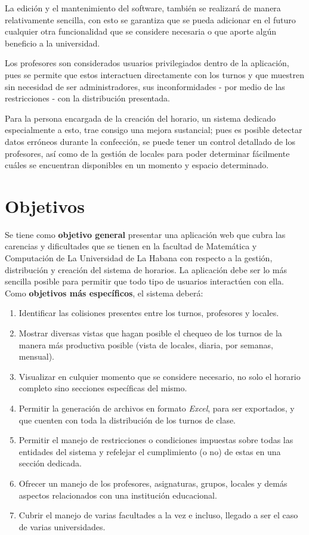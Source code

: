 \begin{introduction}
	La edición y el mantenimiento del software, también se realizará de manera relativamente sencilla, con esto se garantiza que se pueda adicionar en el futuro cualquier otra funcionalidad que se considere necesaria o que aporte algún beneficio a la universidad. 
	
	Los profesores son considerados usuarios privilegiados dentro de la aplicación, pues se permite que estos interactuen directamente con los turnos y que muestren sin necesidad de ser administradores, sus inconformidades - por medio de las restricciones -  con la distribución presentada.
	
	Para la persona encargada de la creación del horario, un sistema dedicado especialmente a esto, trae consigo una mejora sustancial; pues es posible detectar datos erróneos durante la confección, se puede tener un control detallado de los profesores, así como de la gestión de locales para poder determinar fácilmente cuáles se encuentran disponibles en un momento y espacio determinado.

	
	\section{Objetivos}
	Se tiene como \textbf{objetivo general} presentar una aplicación web que cubra las carencias y dificultades que se tienen en la facultad de Matemática y Computación de La Universidad de La Habana con respecto a la gestión, distribución y creación del sistema de horarios. 
	La aplicación debe ser lo más sencilla posible para permitir que todo tipo de usuarios interactúen con ella. Como \textbf{objetivos más específicos}, el sistema deberá:
	\begin{enumerate}
		\item Identificar las colisiones presentes entre los turnos, profesores y locales.
		\item Mostrar diversas vistas que hagan posible el chequeo de los turnos de la manera más productiva posible (vista de locales, diaria, por semanas, mensual).
		\item Visualizar en culquier momento que se considere necesario, no solo el horario completo sino secciones específicas del mismo.
		\item Permitir la generación de archivos en formato \textit{Excel}, para ser exportados, y que cuenten con toda la distribución de los turnos de clase.
		\item Permitir el manejo de restricciones o condiciones impuestas sobre todas las entidades del sistema y refelejar el cumplimiento (o no) de estas en una sección dedicada.
		\item Ofrecer un manejo de los profesores, asignaturas, grupos, locales y demás aspectos relacionados con una institución educacional.
		\item Cubrir el manejo de varias facultades a la vez e incluso, llegado a ser el caso de varias universidades. 
	\end{enumerate}
	

\end{introduction}
